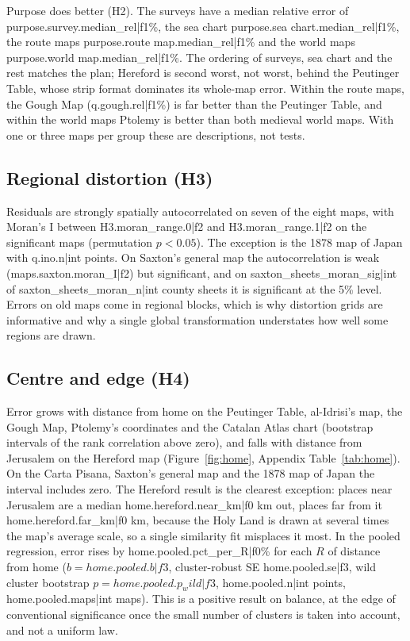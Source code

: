 \documentclass[11pt,a4paper]{article}
\begin{document}
Purpose does better (H2). The surveys have a median relative error of {{purpose.survey.median_rel|f1}}\%, the sea chart {{purpose.sea chart.median_rel|f1}}\%, the route maps {{purpose.route map.median_rel|f1}}\% and the world maps {{purpose.world map.median_rel|f1}}\%. The ordering of surveys, sea chart and the rest matches the plan; Hereford is second worst, not worst, behind the Peutinger Table, whose strip format dominates its whole-map error. Within the route maps, the Gough Map ({{q.gough.rel|f1}}\%) is far better than the Peutinger Table, and within the world maps Ptolemy is better than both medieval world maps. With one or three maps per group these are descriptions, not tests.

\subsection{Regional distortion (H3)}
Residuals are strongly spatially autocorrelated on seven of the eight maps, with Moran's I between {{H3.moran_range.0|f2}} and {{H3.moran_range.1|f2}} on the significant maps (permutation $p < 0.05$). The exception is the 1878 map of Japan with {{q.ino.n|int}} points. On Saxton's general map the autocorrelation is weak ({{maps.saxton.moran_I|f2}}) but significant, and on {{saxton_sheets_moran_sig|int}} of {{saxton_sheets_moran_n|int}} county sheets it is significant at the 5\% level. Errors on old maps come in regional blocks, which is why distortion grids are informative and why a single global transformation understates how well some regions are drawn.

\subsection{Centre and edge (H4)}
Error grows with distance from home on the Peutinger Table, al-Idrisi's map, the Gough Map, Ptolemy's coordinates and the Catalan Atlas chart (bootstrap intervals of the rank correlation above zero), and falls with distance from Jerusalem on the Hereford map (Figure~\ref{fig:home}, Appendix Table~\ref{tab:home}). On the Carta Pisana, Saxton's general map and the 1878 map of Japan the interval includes zero. The Hereford result is the clearest exception: places near Jerusalem are a median {{home.hereford.near_km|f0}} km out, places far from it {{home.hereford.far_km|f0}} km, because the Holy Land is drawn at several times the map's average scale, so a single similarity fit misplaces it most. In the pooled regression, error rises by {{home.pooled.pct_per_R|f0}}\% for each $R$ of distance from home ($b = {{home.pooled.b|f3}}$, cluster-robust SE {{home.pooled.se|f3}}, wild cluster bootstrap $p = {{home.pooled.p_wild|f3}}$, {{home.pooled.n|int}} points, {{home.pooled.maps|int}} maps). This is a positive result on balance, at the edge of conventional significance once the small number of clusters is taken into account, and not a uniform law.
\end{document}
